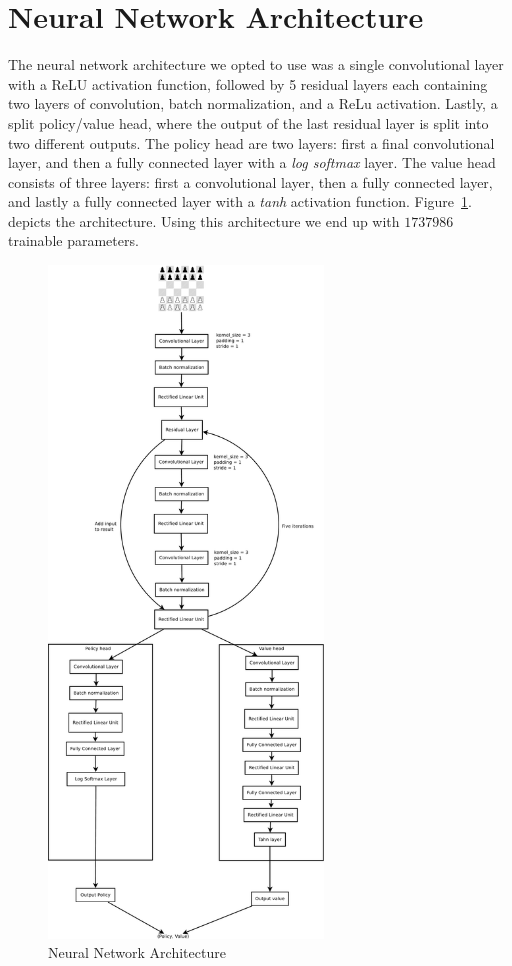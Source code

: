\section{Neural Network Architecture}

The neural network architecture we opted to use was a single convolutional layer with a ReLU activation function, followed by 5 residual layers each containing two layers of convolution, batch normalization, and a ReLu activation. Lastly, a split policy/value head, where the output of the last residual layer is split into two different outputs. The policy head are two layers: first a final convolutional layer, and then a fully connected layer with a \textit{log softmax} layer. The value head consists of three layers: first a convolutional layer, then a fully connected layer, and lastly a fully connected layer with a \textit{tanh} activation function. Figure~\ref{fig:nnarch}. depicts the architecture. Using this architecture we end up with $1737986$ trainable parameters.

\begin{figure}[]
    \centering

    \includegraphics[width=0.65\textwidth]{graphics/test}

    \caption{Neural Network Architecture}
    \label{fig:nnarch}
\end{figure}

